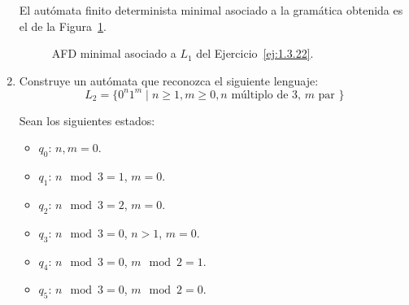 \begin{ejercicio}
\begin{enumerate}
            El autómata finito determinista minimal asociado a la gramática obtenida es el de la Figura~\ref{fig:1.3.22-L1}.
            \begin{figure}
                \centering
                \caption{AFD minimal asociado a $L_1$ del Ejercicio~\ref{ej:1.3.22}.}
                \label{fig:1.3.22-L1}
            \end{figure}
        \item Construye un autómata que reconozca el siguiente lenguaje:
            \begin{equation*}
                L_2 = \{0^n 1^m \mid n\geq 1, m\geq 0, n \text{ múltiplo de 3, } m \text{ par }\}
            \end{equation*}

            Sean los siguientes estados:
            \begin{itemize}
                \item \ul{$q_0$}: $n,m=0$.
                \item \ul{$q_1$}: $n \mod 3=1$, $m=0$.
                \item \ul{$q_2$}: $n \mod 3=2$, $m=0$.
                \item \ul{$q_3$}: $n \mod 3=0$, $n>1$, $m=0$.
                \item \ul{$q_4$}: $n \mod 3=0$, $m\mod 2=1$.
                \item \ul{$q_5$}: $n \mod 3=0$, $m\mod 2=0$.
            \end{itemize}


\end{enumerate}
\end{ejercicio}
